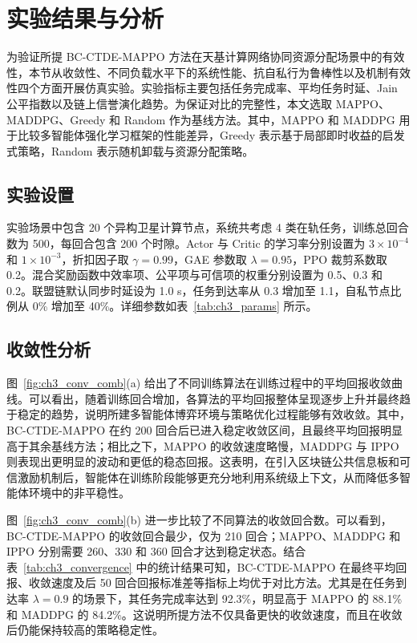 
\section{实验结果与分析}
\label{sec:ch3_experiment}

为验证所提 BC-CTDE-MAPPO 方法在天基计算网络协同资源分配场景中的有效性，本节从收敛性、不同负载水平下的系统性能、抗自私行为鲁棒性以及机制有效性四个方面开展仿真实验。实验指标主要包括任务完成率、平均任务时延、Jain 公平指数以及链上信誉演化趋势。为保证对比的完整性，本文选取 MAPPO、MADDPG、Greedy 和 Random 作为基线方法。其中，MAPPO 和 MADDPG 用于比较多智能体强化学习框架的性能差异，Greedy 表示基于局部即时收益的启发式策略，Random 表示随机卸载与资源分配策略。

\subsection{实验设置}
实验场景中包含 20 个异构卫星计算节点，系统共考虑 4 类在轨任务，训练总回合数为 500，每回合包含 200 个时隙。Actor 与 Critic 的学习率分别设置为 $3\times10^{-4}$ 和 $1\times10^{-3}$，折扣因子取 $\gamma=0.99$，GAE 参数取 $\lambda=0.95$，PPO 裁剪系数取 0.2。混合奖励函数中效率项、公平项与可信项的权重分别设置为 0.5、0.3 和 0.2。联盟链默认同步时延设为 1.0 s，任务到达率从 0.3 增加至 1.1，自私节点比例从 0\% 增加至 40\%。详细参数如表~\ref{tab:ch3_params} 所示。

\subsection{收敛性分析}
图~\ref{fig:ch3_conv_comb}(a) 给出了不同训练算法在训练过程中的平均回报收敛曲线。可以看出，随着训练回合增加，各算法的平均回报整体呈现逐步上升并最终趋于稳定的趋势，说明所建多智能体博弈环境与策略优化过程能够有效收敛。其中，BC-CTDE-MAPPO 在约 200 回合后已进入稳定收敛区间，且最终平均回报明显高于其余基线方法；相比之下，MAPPO 的收敛速度略慢，MADDPG 与 IPPO 则表现出更明显的波动和更低的稳态回报。这表明，在引入区块链公共信息板和可信激励机制后，智能体在训练阶段能够更充分地利用系统级上下文，从而降低多智能体环境中的非平稳性。

图~\ref{fig:ch3_conv_comb}(b) 进一步比较了不同算法的收敛回合数。可以看到，BC-CTDE-MAPPO 的收敛回合最少，仅为 210 回合；MAPPO、MADDPG 和 IPPO 分别需要 260、330 和 360 回合才达到稳定状态。结合表~\ref{tab:ch3_convergence} 中的统计结果可知，BC-CTDE-MAPPO 在最终平均回报、收敛速度及后 50 回合回报标准差等指标上均优于对比方法。尤其是在任务到达率 $\lambda=0.9$ 的场景下，其任务完成率达到 92.3\%，明显高于 MAPPO 的 88.1\% 和 MADDPG 的 84.2\%。这说明所提方法不仅具备更快的收敛速度，而且在收敛后仍能保持较高的策略稳定性。

